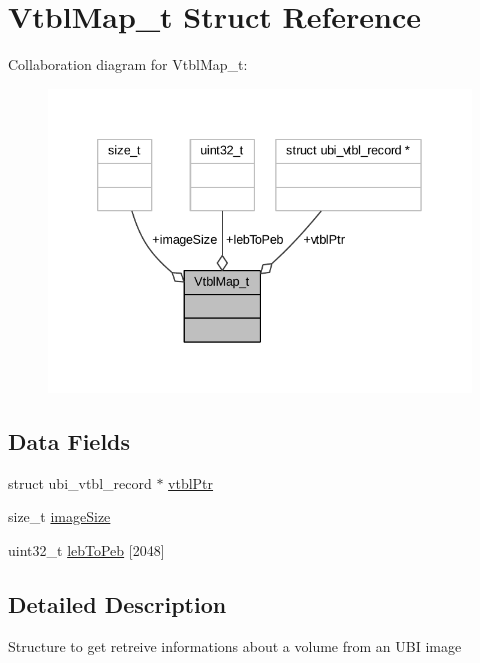 \hypertarget{struct_vtbl_map__t}{}\section{Vtbl\+Map\+\_\+t Struct Reference}
\label{struct_vtbl_map__t}


Collaboration diagram for Vtbl\+Map\+\_\+t\+:
\nopagebreak
\begin{figure}[H]
\begin{center}
\leavevmode
\includegraphics[width=339pt]{struct_vtbl_map__t__coll__graph}
\end{center}
\end{figure}
\subsection*{Data Fields}
\begin{DoxyCompactItemize}
\item 
struct ubi\+\_\+vtbl\+\_\+record $\ast$ \hyperlink{struct_vtbl_map__t_a3d1fa6b61320dc19dc33ea96fd0846dd}{vtbl\+Ptr}
\item 
size\+\_\+t \hyperlink{struct_vtbl_map__t_a36742bd234cebd53fab88b9926050a4e}{image\+Size}
\item 
uint32\+\_\+t \hyperlink{struct_vtbl_map__t_ae4762690bee41ef7d7fdd0f6afda3eff}{leb\+To\+Peb} \mbox{[}2048\mbox{]}
\end{DoxyCompactItemize}


\subsection{Detailed Description}
Structure to get retreive informations about a volume from an U\+BI image 

